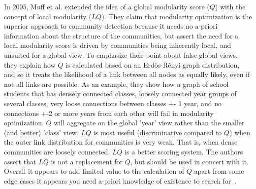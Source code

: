 \par{In 2005, Muff et al. extended the idea of a global modularity score ($Q$) with the concept of local modularity ($LQ$). 
They claim that modularity optimization is the superior approach to community detection because it needs no a-priori information about the structure of the communities, but assert the need for a local modularity score is driven by communities being inherently local, and unsuited for a global view.
To emphasize their point about false global views, they explain how $Q$ is calculated based on an Erdős-Rényi graph distribution, and so it treats the likelihood of a link between all nodes as equally likely, even if not all links are possible. 
As an example, they show how a graph of school students that has densely connected classes, loosely connected year groups of several classes, very loose connections between classes +- 1 year, and no connections +-2 or more years from each other will fail in modularity optimization. 
$Q$ will aggregate on the global 'year' view rather than the smaller (and better) 'class' view. 
$LQ$ is most useful (discriminative compared to $Q$) when the outer link distribution for communities is very weak. 
That is, when dense communities are loosely connected, $LQ$ is a better scoring system. 
The authors assert that $LQ$ is not a replacement for $Q$, but should be used in concert with it. 
Overall it appears to add limited value to the calculation of $Q$ apart from some edge cases it appears you need a-priori knowledge of existence to search for~\cite{Muff2005}.}

